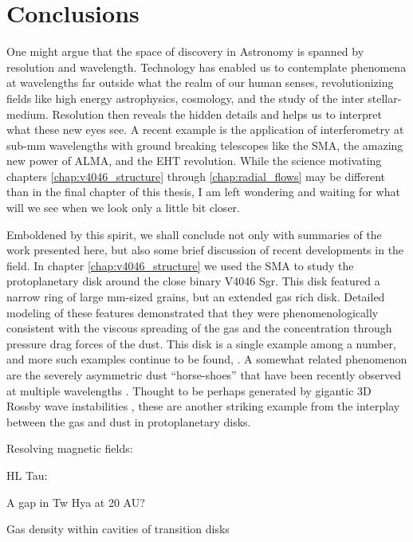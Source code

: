 \chapter{Conclusions} \label{chap:conclusion}

One might argue that the space of discovery in Astronomy is spanned by resolution and 
wavelength.  Technology has enabled us to contemplate phenomena at wavelengths far outside 
what the realm of our human senses, revolutionizing fields like high energy astrophysics,
cosmology, and the study of the inter stellar-medium.  Resolution then reveals the hidden
details and helps us to interpret what these new eyes see.  A recent example is 
the application of interferometry at sub-mm wavelengths with ground breaking telescopes like the SMA, 
the amazing new power of ALMA, and the EHT revolution.  
While the science motivating chapters \ref{chap:v4046_structure} 
through \ref{chap:radial_flows} may be different than in the final chapter of this thesis, 
I am left wondering and waiting for what will we see when we look only a little bit closer.

Emboldened by this spirit, we shall conclude not only with summaries of the work presented here,
but also some brief discussion of recent developments in the field.  In chapter \ref{chap:v4046_structure} we 
used the SMA to study the protoplanetary disk 
around the close binary V4046 Sgr.  This disk featured a narrow ring of large mm-sized grains, 
but an extended gas rich disk.  Detailed modeling of these features demonstrated that they were 
phenomenologically consistent with the viscous spreading of the gas and the concentration through pressure 
drag forces of the dust.  This disk is a single example among a number, and more such examples continue to be 
found, \citep{isella07,panic09,andrews12,degregorio-monsalvo13,ke14}.  A somewhat related phenomenon are the 
severely asymmetric dust  ``horse-shoes'' that have been recently observed at multiple wavelengths
\citep{vandermarel13,fukagawa13,isella13,casassus15,marino15}.  Thought to be perhaps generated by gigantic 
3D Rossby wave instabilities \citep{regaly13}, these are another striking example from the interplay between
the gas and dust in protoplanetary disks.

Resolving magnetic fields: \citep{stephens14}

HL Tau: \citep{brogan14}

A gap in Tw Hya at 20 AU? \citep{akiyama15}

Gas density within cavities of transition disks \citep{vandermarel15}

